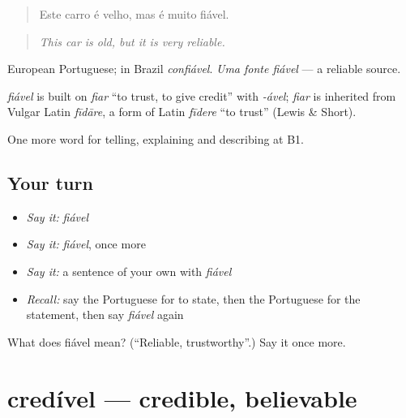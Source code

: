 \begin{quote}
Este carro é velho, mas é muito fiável.
\end{quote}

\begin{quote}
\emph{This car is old, but it is very reliable.}
\end{quote}

European Portuguese; in Brazil \emph{confiável}. \emph{Uma fonte fiável} — a reliable source.

\begin{cousinweb}
\emph{fiável} is built on \emph{fiar} \textquotedblleft{}to trust, to give credit\textquotedblright{} with \emph{-ável}; \emph{fiar} is inherited from Vulgar Latin \emph{fīdāre}, a form of Latin \emph{fīdere} \textquotedblleft{}to trust\textquotedblright{} (Lewis \& Short).
\end{cousinweb}

\begin{grammarlens}[title={What you've built}]
One more word for telling, explaining and describing at B1.
\end{grammarlens}

\subsection*{Your turn}
\begin{itemize}
\raggedright
  \item \emph{Say it:} \emph{fiável}
  \item \emph{Say it:} \emph{fiável}, once more
  \item \emph{Say it:} a sentence of your own with \emph{fiável}
  \item \emph{Recall:} say the Portuguese for to state, then the Portuguese for the statement, then say \emph{fiável} again
\end{itemize}

\begin{tcolorbox}[breakable,colback=teal!4,colframe=teal!35!black,title={Before you move on}]
What does fiável mean? (\textquotedblleft{}Reliable, trustworthy\textquotedblright{}.) Say it once more.
\end{tcolorbox}
\section[credível]{credível — credible, believable}

\label{lesson:PT-C342-credivel}



